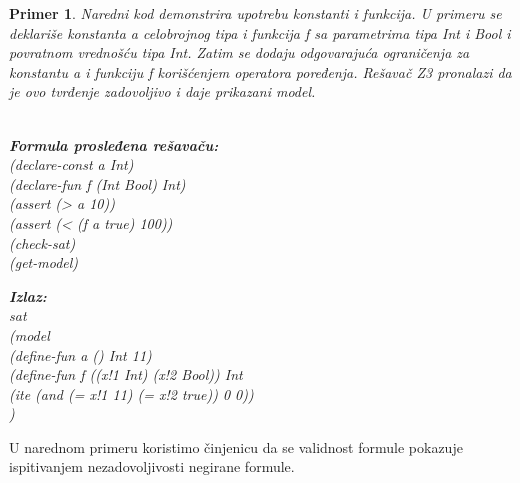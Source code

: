 \documentclass[12pt,oneside]{memoir}
\newcommand\tab[1][0.5cm]{\hspace*{#1}}
\newtheorem{primer}{Primer}
\begin{document}
\begin{primer} Naredni kod demonstrira upotrebu konstanti i funkcija. U primeru se deklariše konstanta a celobrojnog tipa i funkcija f sa parametrima tipa Int i Bool i povratnom vrednošću tipa Int. Zatim se dodaju odgovarajuća ograničenja za konstantu a i funkciju f korišćenjem operatora poređenja. Rešavač Z3 pronalazi da je ovo tvrđenje zadovoljivo i daje prikazani model. 
\\ \\

\hspace{-0.7cm}
\begin{minipage}[b]{0.43\textwidth}
\textbf{Formula prosleđena rešavaču:}\\
(declare-const a Int)\\
(declare-fun f (Int Bool) Int)\\
(assert (> a 10))\\
(assert (< (f a true) 100))\\
(check-sat)\\
(get-model) \\
\end{minipage}
\hspace{0.6cm}
\begin{minipage}[t]{0.5\textwidth}
\vspace{-4.715cm}
\textbf{Izlaz:}
\\sat 
\\(model 
\\\tab(define-fun a () Int 11) 
\\\tab(define-fun f ((x!1 Int) (x!2 Bool)) Int 
\\\tab(ite (and (= x!1 11) (= x!2 true)) 0 0))
\\)
\end{minipage}
\end{primer}

U narednom primeru koristimo činjenicu da se validnost formule pokazuje ispitivanjem nezadovoljivosti negirane formule. 
\end{document}
